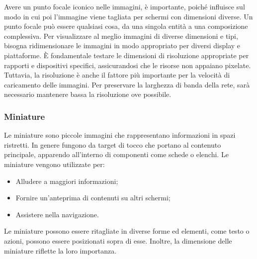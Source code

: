 \documentclass[12pt, a4paper]{report}
\begin{document}
	Avere un punto focale iconico nelle immagini, è importante, poiché influisce sul modo in cui poi l’immagine viene tagliata per schermi con dimensioni diverse. Un punto focale può essere qualsiasi cosa, da una singola entità a una composizione complessiva. Per visualizzare al meglio immagini di diverse dimensioni e tipi, bisogna ridimensionare le immagini
	in modo appropriato per diversi display e piattaforme. È fondamentale testare le dimensioni di risoluzione appropriate per rapporti e dispositivi specifici, assicurandosi che le risorse non appaiano pixelate. Tuttavia, la risoluzione è anche il fattore più importante per la velocità di caricamento delle immagini. Per preservare la larghezza di banda della rete, sarà necessario mantenere bassa la risoluzione ove possibile.

	\subsubsection{Miniature}
	Le miniature sono piccole immagini che rappresentano informazioni in spazi ristretti. In genere fungono da target di tocco che portano al contenuto principale, apparendo all'interno di componenti come schede o elenchi. Le miniature vengono utilizzate per:
	\begin{itemize}
		\item Alludere a maggiori informazioni;
		\item Fornire un’anteprima di contenuti su altri schermi;
		\item Assistere nella navigazione.
	\end{itemize}
	Le miniature possono essere ritagliate in diverse forme ed elementi, come testo o azioni, possono essere posizionati sopra di esse. Inoltre, la dimensione delle miniature riflette la loro importanza.
\end{document}
